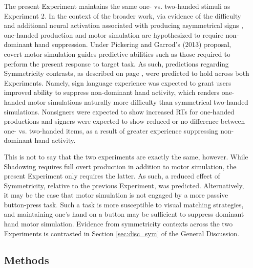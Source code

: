             The present Experiment maintains the same one- vs. two-handed stimuli as Experiment 2. In the context of the broader work, via evidence of the difficulty and additional neural activation associated with producing asymmetrical signs \cite{meier2006, hickok1996, emm2016}, one-handed production and motor simulation are hypothesized to require non-dominant hand suppression. Under Pickering and Garrod's (2013) proposal, covert motor simulation guides predictive abilities such as those required to perform the present response to target task. As such, predictions regarding Symmetricity contrasts, as described on page \pageref{par:sym_hyp}, were predicted to hold across both Experiments. Namely, sign language experience was expected to grant users improved ability to suppress non-dominant hand activity, which renders one-handed motor simulations naturally more difficulty than symmetrical two-handed simulations. Nonsigners were expected to show increased RTs for one-handed productions and signers were expected to show reduced or no difference between one- vs. two-handed items, as a result of greater experience suppressing non-dominant hand activity. \par
            This is not to say that the two experiments are exactly the same, however. While Shadowing requires full overt production in addition to motor simulation, the present Experiment only requires the latter. As such, a reduced effect of Symmetricity, relative to the previous Experiment, was predicted. Alternatively, it may be the case that motor simulation is not engaged by a more passive button-press task. Such a task is more susceptible to visual matching strategies, and maintaining one’s hand on a button may be sufficient to suppress dominant hand motor simulation. Evidence from symmetricity contexts across the two Experiments is contrasted in Section \ref{sec:disc_sym} of the General Discussion.\par
    \subsection{Methods}
        \label{sec:trans_meth}
